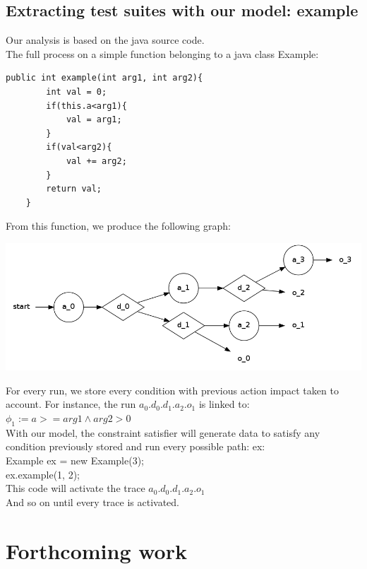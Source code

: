 \documentclass[a4paper]{report}
\begin{document}
\section*{Extracting test suites with our model: example}

Our analysis is based on the java source code.\\

The full process on a simple function belonging to a java class Example:\\


\begin{lstlisting}
public int example(int arg1, int arg2){
		int val = 0;
		if(this.a<arg1){
			val = arg1;
		}
		if(val<arg2){
			val += arg2;
		}
		return val;
	}
\end{lstlisting}
From this function, we produce the following graph:\\

\begin{center}
   \includegraphics[scale=0.3]{../graphviz/doubleStackGraph.png}
\end{center}

For every run, we store every condition with previous action impact taken to account.
For instance, the run $a_0.d_0.d_1.a_2.o_1$ is linked to:\\ $\phi_1
:= a >= arg1 \wedge arg2 > 0$ \\
With our model, the constraint satisfier will generate data to satisfy any condition previously stored and run every possible path:
ex:\\
Example ex = new Example(3);\\
ex.example(1, 2);\\
This code will activate the trace $a_0.d_0.d_1.a_2.o_1$\\

And so on until every trace is activated.



\chapter*{Forthcoming work}
\end{document}

